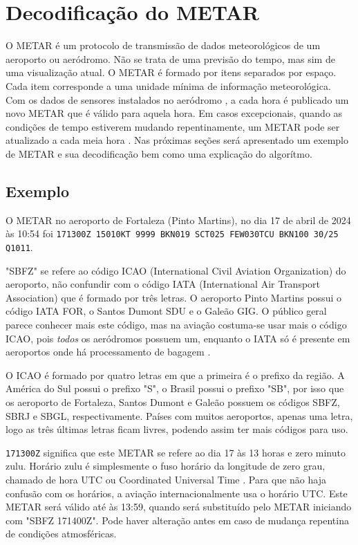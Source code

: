 \chapter{Decodificação do METAR}

O METAR é um protocolo de transmissão de dados meteorológicos de um aeroporto ou aeródromo. Não se trata de 
uma previsão do tempo, mas sim de uma visualização atual. O METAR é formado por itens separados por espaço. 
Cada item corresponde a uma unidade mínima de informação meteorológica. Com os dados de sensores instalados 
no aeródromo \cite{metar-weather-gov}, a cada hora é publicado um novo METAR que é válido para aquela hora. 
Em casos excepcionais, quando as condições de tempo estiverem mudando repentinamente, um METAR pode ser atualizado 
a cada meia hora \cite{METAR-speci}. Nas próximas seções será apresentado um exemplo de METAR e sua 
decodificação bem como uma explicação do algorítmo.

\section{Exemplo}
O METAR no aeroporto de Fortaleza (Pinto Martins)\cite{METAR-sbfz}, no dia 17 de abril de 2024 às 10:54 foi
\texttt{171300Z 15010KT 9999 BKN019 SCT025 FEW030TCU BKN100 30/25 Q1011}.

"SBFZ" se refere ao código ICAO (International Civil Aviation Organization) do aeroporto, não confundir 
com o código IATA (International Air Transport Association) que é formado por três letras. O aeroporto Pinto 
Martins possui o código IATA FOR, o Santos Dumont SDU e o Galeão GIG. O público geral parece conhecer mais este 
código, mas na aviação costuma-se usar mais o código ICAO, pois \textit{todos} os aeródromos possuem um, 
enquanto o IATA só é presente em aeroportos onde há processamento de bagagem \cite{iata-codes} \cite{icao-codes}.

O ICAO é formado por quatro letras em que a primeira é o prefixo da região. A América do Sul possui o prefixo "S", 
o Brasil possui o prefixo "SB", por isso que os aeroporto de Fortaleza, Santos Dumont e Galeão possuem os códigos 
SBFZ, SBRJ e SBGL, respectivamente. Países com muitos aeroportos, apenas uma letra, 
logo as três últimas letras ficam livres, podendo assim ter mais códigos para uso.

\texttt{171300Z} significa que este METAR se refere ao dia 17 às 13 horas e zero minuto zulu. Horário zulu é 
simplesmente o fuso horário da longitude de zero grau, chamado de hora UTC ou Coordinated Universal Time \cite{UTC}. 
Para que não haja confusão com os horários, a aviação internacionalmente usa o horário UTC. Este METAR será 
válido até às 13:59, quando será substituído pelo METAR iniciando com "SBFZ 171400Z". Pode haver alteração antes
em caso de mudança repentina de condições atmosféricas.

